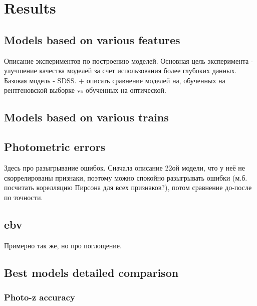 \section{Results}\label{sec:exps}

\subsection{Models based on various features}

Описание экспериментов по построению моделей. Основная цель эксперимента - улучшение качества моделей за счет использования более глубоких данных. Базовая модель - SDSS. + описать сравнение моделей на, обученных на рентгеновской выборке vs обученных на оптической.

\subsection{Models based on various trains}

\subsection{Photometric errors}

Здесь про разыгрывание ошибок. Сначала описание 22ой модели, что у неё не скоррелированы признаки, поэтому можно спокойно разыгрывать ошибки (м.б. посчитать корелляцию Пирсона для всех признаков?), потом сравнение до-после по точности.

\subsection{ebv}

Примерно так же, но про поглощение.

\subsection{Best models detailed comparison}




\subsubsection{Photo-z accuracy}

